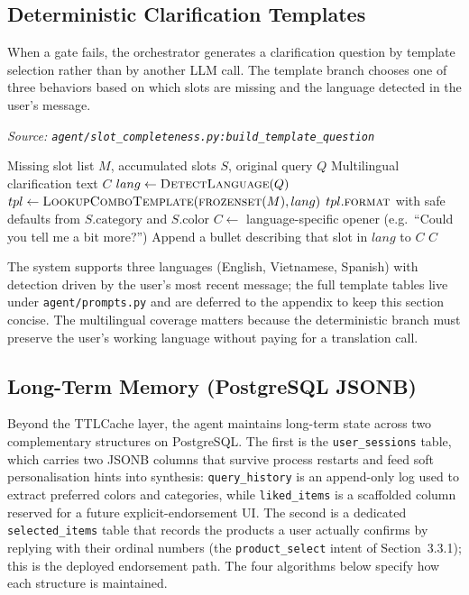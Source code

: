 \subsection{Deterministic Clarification Templates}

When a gate fails, the orchestrator generates a clarification question by template selection rather than by another LLM call. The template branch chooses one of three behaviors based on which slots are missing and the language detected in the user's message.

\begin{algorithm}[H]
\caption{Build Clarification Question (deterministic template branch)}\label{alg:build_clarification}
\textit{Source: \texttt{agent/slot\_completeness.py:build\_template\_question}}
\begin{algorithmic}[1]
\Require Missing slot list $M$, accumulated slots $S$, original query $Q$
\Ensure Multilingual clarification text $C$
    \State $lang \gets \textsc{DetectLanguage}(Q)$ 
    \State $tpl \gets \textsc{LookupComboTemplate}(\textsc{frozenset}(M), lang)$
        \State \Return $tpl.\textsc{format}$ with safe defaults from $S.\text{category}$ and $S.\text{color}$
    \EndIf
    \State $C \gets$ language-specific opener (e.g.\ ``Could you tell me a bit more?'')
        \State Append a bullet describing that slot in $lang$ to $C$
    \EndFor
    \State \Return $C$
\EndFunction
\end{algorithmic}
\end{algorithm}

The system supports three languages (English, Vietnamese, Spanish) with detection driven by the user's most recent message; the full template tables live under \texttt{agent/prompts.py} and are deferred to the appendix to keep this section concise. The multilingual coverage matters because the deterministic branch must preserve the user's working language without paying for a translation call.

\subsection{Long-Term Memory (PostgreSQL JSONB)}

Beyond the TTLCache layer, the agent maintains long-term state across two complementary structures on PostgreSQL. The first is the \texttt{user\_sessions} table, which carries two JSONB columns that survive process restarts and feed soft personalisation hints into synthesis: \texttt{query\_history} is an append-only log used to extract preferred colors and categories, while \texttt{liked\_items} is a scaffolded column reserved for a future explicit-endorsement UI. The second is a dedicated \texttt{selected\_items} table that records the products a user actually confirms by replying with their ordinal numbers (the \texttt{product\_select} intent of Section~3.3.1); this is the deployed endorsement path. The four algorithms below specify how each structure is maintained.

